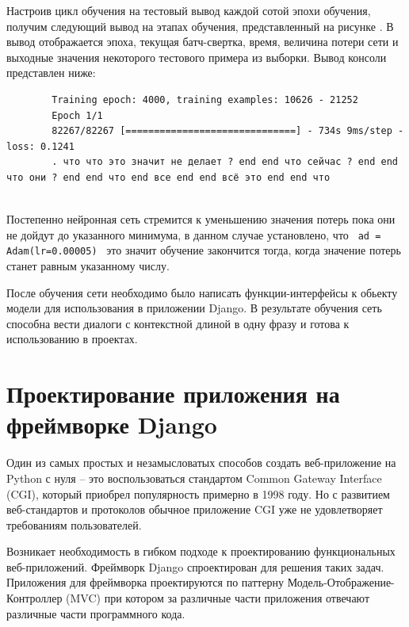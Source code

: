 Настроив цикл обучения на тестовый вывод каждой сотой эпохи обучения, получим следующий вывод на этапах обучения, представленный на рисунке . В вывод отображается эпоха, текущая батч-свертка, время, величина потери сети и выходные значения некоторого тестового примера из выборки. Вывод консоли представлен ниже:


\begin{minipage}{0.9\textwidth}
   
        \begin{verbatim}
        Training epoch: 4000, training examples: 10626 - 21252
        Epoch 1/1
        82267/82267 [==============================] - 734s 9ms/step - loss: 0.1241
        . что что это значит не делает ? end end что сейчас ? end end что они ? end end что end все end end всё это end end что 
        \end{verbatim}
    
\end{minipage}\\[1.5pt]


Постепенно нейронная сеть стремится к уменьшению значения потерь пока они не дойдут до указанного минимума, в данном случае установлено, что \texttt{ ad = Adam(lr=0.00005) } это значит обучение закончится тогда, когда значение потерь станет равным указанному числу. 

После обучения сети необходимо было написать функции-интерфейсы к обьекту модели для использования в приложении Django. В результате обучения сеть способна вести диалоги с контекстной длиной в одну фразу и готова к использованию в проектах. 

\section{Проектирование приложения на фреймворке Django}
Один из самых простых и незамысловатых способов создать веб-приложение на Python с нуля – это воспользоваться стандартом Common Gateway Interface (CGI), который приобрел популярность примерно в 1998 году. Но с развитием веб-стандартов и протоколов обычное приложение CGI уже не удовлетворяет требованиям пользователей. 

Возникает необходимость в гибком подходе к проектированию функциональных веб-приложений. Фреймворк Django спроектирован для решения таких задач. Приложения для фреймворка проектируются по паттерну Модель-Отображение-Контроллер (MVC) при котором за различные части приложения отвечают различные части программного кода. 

